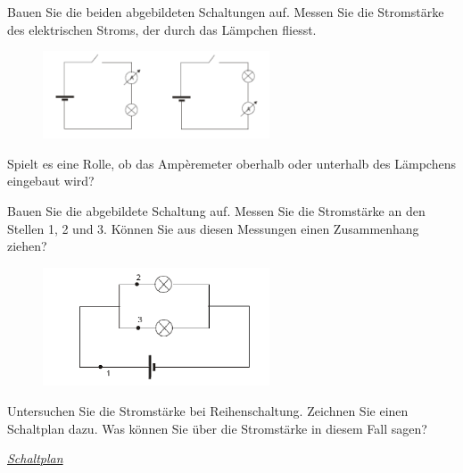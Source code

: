 \documentclass[11pt]{article}
\newenvironment{enumerate*}%
  {\begin{enumerate}%
    \setlength{\itemsep}{2pt}%
    \setlength{\parskip}{2pt}}%
  {\end{enumerate}}
\begin{document}
\begin{enumerate*}
    \item Bauen Sie die beiden abgebildeten Schaltungen auf. Messen Sie die Stromstärke des elektrischen Stroms, der durch das Lämpchen fliesst. 
    
    \begin{figure}[h!]
		\centering
		\includegraphics[width=0.6\textwidth]{images/Strom_A1.png}
    	\label{fig:A1}
    \end{figure}

	
	Spielt es eine Rolle, ob das Ampèremeter oberhalb oder unterhalb des Lämpchens eingebaut wird? 
	
	
    
	\newpage

    \item Bauen Sie die abgebildete Schaltung auf. Messen Sie die Stromstärke an den Stellen 1, 2 und 3. Können Sie aus diesen Messungen einen Zusammenhang ziehen?
    
    \vspace{-0.2cm}

    \begin{figure}[h!]
		\centering
    	\includegraphics[width=0.6\textwidth]{images/Strom_A2.png}
    	\label{fig:A2}
    \end{figure}

	
	
    
    \item Untersuchen Sie die Stromstärke bei Reihenschaltung. Zeichnen Sie einen Schaltplan dazu. Was können Sie über die Stromstärke in diesem Fall sagen?
    
	\textit{\underline{Schaltplan}}
	\vfill

\end{enumerate*}
\end{document}
